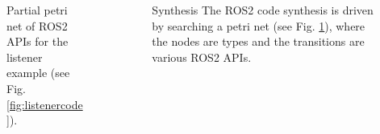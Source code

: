 \documentclass[final]{beamer}
\newlength{\sepwid}
\newlength{\onecolwid}
\newlength{\twocolwid}
\begin{document}
\begin{frame}[t]
\begin{columns}[t]
\begin{column}{\twocolwid}
\begin{columns}[t,totalwidth=\twocolwid]
\begin{column}{\onecolwid}
\begin{figure}

\caption{Partial petri net of ROS2 APIs for the listener example (see Fig. \ref{fig:listenercode}).}
\label{fig:petri}
\end{figure}





\end{column} %

\end{columns} %

\end{column} %

\begin{column}{\sepwid}\end{column} %

\begin{column}{\onecolwid} %

\begin{block}{Synthesis}
The ROS2 code synthesis is driven by searching a petri net (see Fig. \ref{fig:petri}), where the nodes are types and the transitions are various ROS2 APIs.

\end{block}



\end{column}
\end{columns}
\end{frame}
\end{document}
